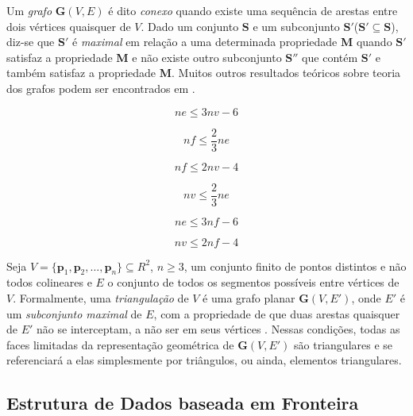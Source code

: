\documentclass[12pt,a4paper]{book}
\begin{document}
Um \textit{grafo} ${\mathbf G}(V, E)$ \'e dito \textit{conexo} quando existe uma sequ\^encia de arestas entre dois v\'ertices quaisquer de $V$. Dado um conjunto ${\mathbf S}$ e um subconjunto ${\mathbf S}'$(${\mathbf S}'\subseteq {\mathbf S}$), diz-se que ${\mathbf S}'$ \'e \textit{maximal} em rela\c{c}\~{a}o a uma determinada propriedade \textbf{M} quando ${\mathbf S}'$ satisfaz a propriedade \textbf{M} e n\~ao existe outro subconjunto ${\mathbf S}''$ que cont\'em ${\mathbf S}'$ e tamb\'em satisfaz a propriedade \textbf{M}. Muitos outros resultados te\'oricos sobre teoria dos grafos podem ser encontrados em \cite{szwarcfiter}.

\begin{equation} \label{Euler_ineq1}
ne\leq 3nv-6
\end{equation}

\begin{equation} \label{Euler_ineq2}
nf\leq \frac{2}{3}ne
\end{equation}

\begin{equation} \label{Euler_ineq3}
nf\leq 2nv-4
\end{equation}

\begin{equation} \label{Euler_ineq4}
nv \leq \frac{2}{3}ne
\end{equation}

\begin{equation} \label{Euler_ineq5}
ne \leq 3nf-6
\end{equation}

\begin{equation} \label{Euler_ineq6}
nv \leq 2nf-4
\end{equation}

Seja $V=\lbrace{\mathbf p}_1,{\mathbf p}_2,\ldots, {\mathbf p}_n\rbrace \subseteq R^2$, $n\geq 3$, um conjunto finito de pontos distintos e n\~ao todos colineares e $E$ o conjunto de todos os segmentos poss\'iveis entre v\'ertices de $V$. Formalmente, uma \textit{triangula\c{c}\~{a}o} de $V$ \'e uma grafo planar ${\mathbf G}(V,E')$, onde $E'$ \'e um \textit{subconjunto maximal} de $E$, com a propriedade de que duas arestas quaisquer de $E'$ n\~ao se interceptam, a n\~ao ser em seus v\'ertices \cite{lee}. Nessas condi\c{c}\~{o}es, todas as faces limitadas da representa\c{c}\~{a}o geom\'etrica de ${\mathbf G}(V,E')$ s\~ao triangulares e se referenciar\'a a elas simplesmente por tri\^angulos, ou ainda, elementos triangulares.

\subsection{Estrutura de Dados baseada em Fronteira}
\end{document}
